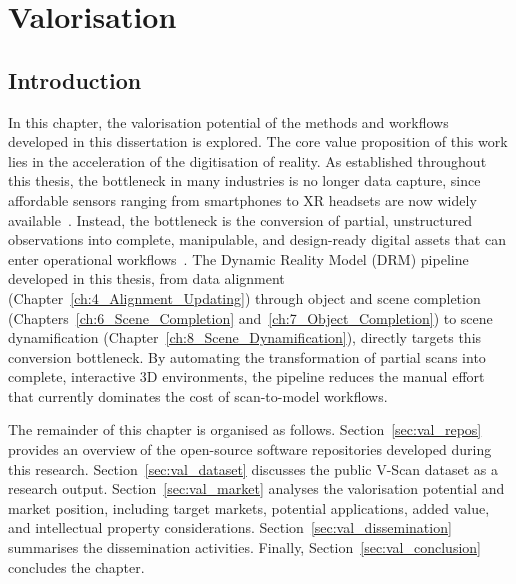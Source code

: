 
\cleardoublepage
{}
\cleardoublepage


\chapter{Valorisation} \label{ch:Valorisation}

\section{Introduction}
\label{sec:val_intro}

In this chapter, the valorisation potential of the methods and workflows developed in this dissertation is explored. The core value proposition of this work lies in the acceleration of the digitisation of reality. As established throughout this thesis, the bottleneck in many industries is no longer data capture, since affordable sensors ranging from smartphones to XR headsets are now widely available~\cite{vermandere_two-step_2022}. Instead, the bottleneck is the conversion of partial, unstructured observations into complete, manipulable, and design-ready digital assets that can enter operational workflows~\cite{vermandere_geometry_2025}. The Dynamic Reality Model (DRM) pipeline developed in this thesis, from data alignment (Chapter~\ref{ch:4_Alignment_Updating}) through object and scene completion (Chapters~\ref{ch:6_Scene_Completion} and~\ref{ch:7_Object_Completion}) to scene dynamification (Chapter~\ref{ch:8_Scene_Dynamification}), directly targets this conversion bottleneck. By automating the transformation of partial scans into complete, interactive 3D environments, the pipeline reduces the manual effort that currently dominates the cost of scan-to-model workflows.

The remainder of this chapter is organised as follows. Section~\ref{sec:val_repos} provides an overview of the open-source software repositories developed during this research. Section~\ref{sec:val_dataset} discusses the public V-Scan dataset as a research output. Section~\ref{sec:val_market} analyses the valorisation potential and market position, including target markets, potential applications, added value, and intellectual property considerations. Section~\ref{sec:val_dissemination} summarises the dissemination activities. Finally, Section~\ref{sec:val_conclusion} concludes the chapter.


